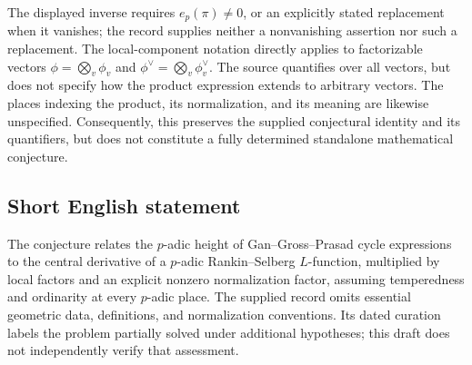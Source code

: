 \documentclass[11pt]{article}
\begin{document}
The displayed inverse requires \(e_p(\pi)\ne0\), or an explicitly stated replacement when it vanishes; the record supplies neither a nonvanishing assertion nor such a replacement. The local-component notation directly applies to factorizable vectors \(\phi=\bigotimes_v\phi_v\) and \(\phi^\vee=\bigotimes_v\phi_v^\vee\). The source quantifies over all vectors, but does not specify how the product expression extends to arbitrary vectors. The places indexing the product, its normalization, and its meaning are likewise unspecified. Consequently, this preserves the supplied conjectural identity and its quantifiers, but does not constitute a fully determined standalone mathematical conjecture.
\subsection{Short English statement}
The conjecture relates the \(p\)-adic height of Gan--Gross--Prasad cycle expressions to the central derivative of a \(p\)-adic Rankin--Selberg \(L\)-function, multiplied by local factors and an explicit nonzero normalization factor, assuming temperedness and ordinarity at every \(p\)-adic place. The supplied record omits essential geometric data, definitions, and normalization conventions. Its dated curation labels the problem partially solved under additional hypotheses; this draft does not independently verify that assessment.
\end{document}
